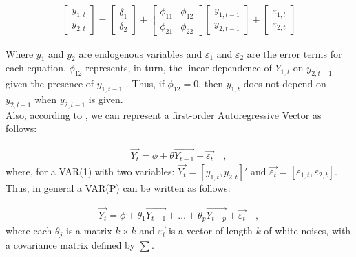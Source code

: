 \begin{align} \label{eq:var1}
    \begin{bmatrix}
    y_{1,t} \\
    y_{2,t}
    \end{bmatrix} = 
    \begin{bmatrix}
    \delta_1\\
    \delta_2
    \end{bmatrix} +
    \begin{bmatrix}
    \phi_{11} & \phi_{12} \\
    \phi_{21} & \phi_{22}
    \end{bmatrix}
    \begin{bmatrix}
    y_{1,t-1} \\
    y_{2,t-1}
    \end{bmatrix} +
    \begin{bmatrix}
    \varepsilon_{1,t} \\
    \varepsilon_{2,t}
    \end{bmatrix} 
\end{align}

Where $y_1$ and $y_2$ are endogenous variables and $\varepsilon_1$ and $\varepsilon_2$ are the error terms for each equation. $\phi_{12}$ represents, in turn, the linear dependence of $Y_{1, t}$ on $y_{2, t-1}$ given the presence of $y_{1, t-1}$ . Thus, if $\phi_{12} = 0$, then $y_{1, t}$ does not depend on $y_{2, t-1}$ when $y_{2, t-1}$ is given. \\

Also, according to \cite{verbeek2008guide}, we can represent a first-order Autoregressive Vector as follows:

\begin{align*}
    \overrightarrow{Y_t} = \phi + \theta \overrightarrow{Y_{t-1}} + \overrightarrow{\varepsilon_t} \quad ,
\end{align*}
where, for a VAR(1) with two variables: $\overrightarrow{Y_t} = [y_{1,t}, y_{2, t}]'$ and $\overrightarrow{\varepsilon_t} = [\varepsilon_{1, t}, \varepsilon_{2, t}]$. Thus, in general a VAR(P) can be written as follows:

\begin{align*}
    \overrightarrow{Y_t} = \phi + \theta_1 \overrightarrow{Y_{t-1}} + \dots + \theta_p \overrightarrow{Y_{t-p}} + \overrightarrow{\varepsilon_t} \quad ,
\end{align*}
where each $\theta_j$ is a matrix $k \times k$ and $\overrightarrow{\varepsilon_t}$ is a vector of length $k$ of white noises, with a covariance matrix defined by $\sum$.\\

